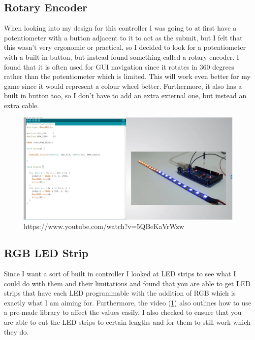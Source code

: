 \documentclass{article}
\begin{document}
\subsection{Rotary Encoder}

When looking into my design for this controller I was going to at first have a potentiometer with a button adjacent to it to act as the submit, but I felt that this wasn't very ergonomic or practical, so I decided to look for a potentiometer with a built in button, but instead found something called a rotary encoder. I found that it is often used for GUI navigation since it rotates in 360 degrees rather than the potentiometer which is limited. This will work even better for my game since it would represent a colour wheel better. Furthermore, it also has a built in button too, so I don't have to add an extra external one, but instead an extra cable.

\begin{figure}[ht]
  \includegraphics[width=\textwidth,height=\textheight,keepaspectratio]{led_strip.PNG}
  \caption{https://www.youtube.com/watch?v=5QBeKaVrWzw}
  \label{fig:rgb_led_strip}
\end{figure}

\subsection{RGB LED Strip}

Since I want a sort of built in controller I looked at LED strips to see what I could do with them and their limitations and found that you are able to get LED strips that have each LED programmable with the addition of RGB which is exactly what I am aiming for. Furthermore, the video (\ref{fig:rgb_led_strip}) also outlines how to use a pre-made library to affect the values easily. I also checked to ensure that you are able to cut the LED strips to certain lengths and for them to still work which they do.
\end{document}
